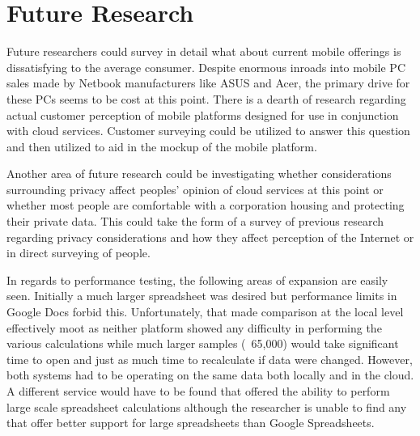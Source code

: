 \section{Future Research}



Future researchers could survey in detail what about current mobile offerings is
dissatisfying to the average consumer.  Despite enormous inroads into mobile PC
sales made by Netbook manufacturers like ASUS and Acer, the primary drive for
these PCs seems to be cost at this point\citep{gladstone09}.  There is a dearth
of research regarding actual customer perception of mobile platforms designed
for use in conjunction with cloud services.  Customer surveying could be
utilized to answer this question and then utilized to aid in the mockup of the
mobile platform.

Another area of future research could be investigating whether considerations
surrounding privacy affect peoples' opinion of cloud services at this point or
whether most people are comfortable with a corporation housing and protecting
their private data.  This could take the form of a survey of previous research
regarding privacy considerations and how they affect perception of the Internet
or in direct surveying of people.


In regards to performance testing, the following areas of expansion are easily
seen.  Initially a much larger spreadsheet was desired but performance limits in
Google Docs forbid this.  Unfortunately, that made comparison at the local level
effectively moot as neither platform showed any difficulty in performing the
various calculations while much larger samples (~65,000) would take significant
time to open and just as much time to recalculate if data were changed.
However, both systems had to be operating on the same data both locally and in
the cloud.  A different service would have to be found that offered the ability
to perform large scale spreadsheet calculations although the researcher is
unable to find any that offer better support for large spreadsheets than Google
Spreadsheets.
